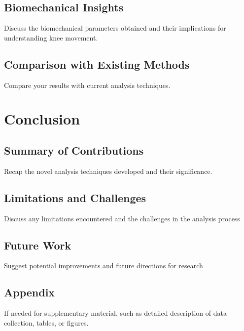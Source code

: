 \documentclass{micro-econ-thesis}
\begin{document}
\subsection{Biomechanical Insights}
Discuss the biomechanical parameters obtained and their implications for understanding knee movement. 
\subsection{Comparison with Existing Methods}
Compare your results with current analysis techniques. 
 

\section{Conclusion}
\subsection{Summary of Contributions}
Recap the novel analysis techniques developed and their significance. 
\subsection{Limitations and Challenges}
Discuss any limitations encountered and the challenges in the analysis process 
\subsection{Future Work}
Suggest potential improvements and future directions for research

\cleardoublepage
{}
{} %
\printbibliography

\cleardoublepage
\begin{appendix}
\section{Appendix}
If needed for supplementary material, such as detailed description of data collection, tables, or figures.

\end{appendix}

\makeThesisDeclaration
\end{document}
